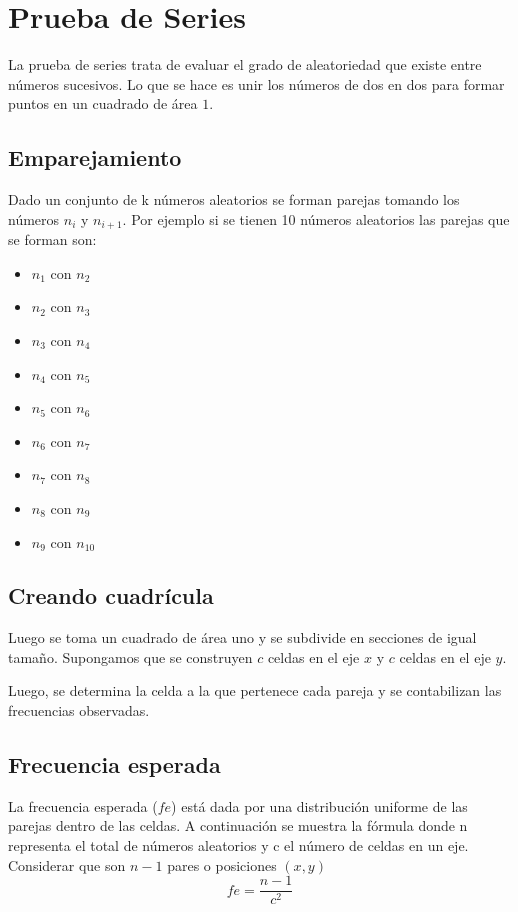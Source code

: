 \section{Prueba de Series}


La prueba de series trata de evaluar el grado de aleatoriedad que existe entre números sucesivos. Lo que se hace es unir los números de dos en dos para formar puntos en un cuadrado de área $1$. 

\subsection{Emparejamiento}
Dado un conjunto de k números aleatorios se forman parejas tomando los números $n_i$ y $n_{i+1}$. Por ejemplo si se tienen 10 números aleatorios las parejas que se forman son:\\
\begin{itemize}
    \item[] $n_1$ con $n_2$
\item[] $n_2$ con $n_3$
\item[] $n_3$ con $n_4$
\item[] $n_4$ con $n_5$
\item[] $n_5$ con $n_6$
\item[] $n_6$ con $n_7$
\item[] $n_7$ con $n_8$
\item[] $n_8$ con $n_9$
\item[] $n_9$ con $n_{10}$
\end{itemize}

\subsection{Creando cuadrícula}
Luego se toma un cuadrado de área uno y se subdivide en secciones de igual tamaño. Supongamos que se construyen $c$ celdas en el eje $x$ y $c$ celdas en el eje $y$.

Luego, se determina la celda a la que pertenece cada pareja y se contabilizan las frecuencias observadas.

\subsection{Frecuencia esperada}
La frecuencia esperada ($fe$) está dada por una distribución uniforme de las parejas dentro de las celdas. A continuación se muestra la fórmula donde n representa el total de números aleatorios y c el número de celdas en un eje. Considerar que son $n-1$ pares o posiciones $(x,y)$
$$fe = \frac{n-1}{c^2}$$

